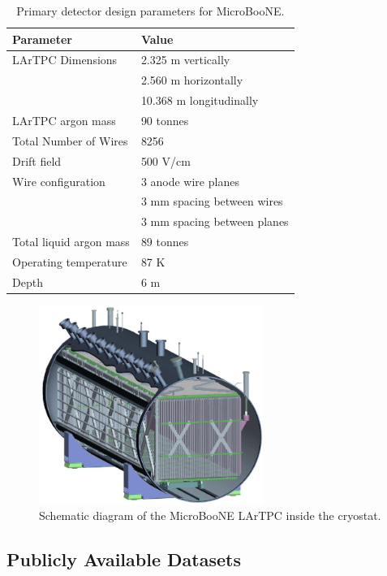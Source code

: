 \documentclass{pracalicmgr}
\begin{document}
\begin{table}[H]
\centering
\caption{Primary detector design parameters for MicroBooNE.\cite{MicroBooNEDesign}}
\begin{tabular}{|l|l|}
\hline
\textbf{Parameter} & \textbf{Value} \\
\hline
LArTPC Dimensions & 2.325 m vertically \\
                  & 2.560 m horizontally \\
                  & 10.368 m longitudinally \\
\hline
LArTPC argon mass & 90 tonnes \\
\hline
Total Number of Wires & 8256 \\
\hline
Drift field & 500 V/cm \\
\hline
Wire configuration & 3 anode wire planes \\
                   & 3 mm spacing between wires \\
                   & 3 mm spacing between planes \\
\hline
Total liquid argon mass & 89 tonnes \\
\hline
Operating temperature & 87 K \\
\hline
Depth & 6 m \\
\hline
\end{tabular}
\label{tab:microboone_specs}
\end{table}


\begin{figure}[H]
    \centering
    \includegraphics[width=0.65\textwidth]{src/microBooNe_Layout.pdf}
    \caption{Schematic diagram of the MicroBooNE LArTPC inside the cryostat.\cite{MicroBooNEDesign}}
    \label{fig:microboone_layout}
\end{figure}

\subsection{Publicly Available Datasets}
\end{document}
